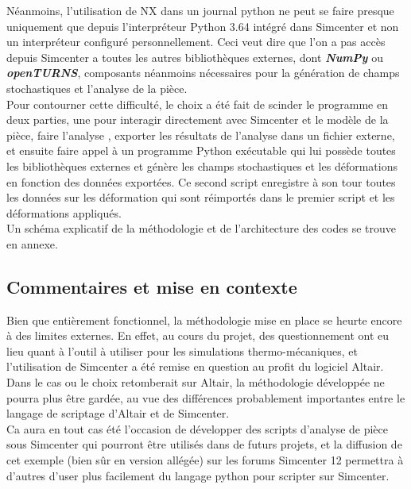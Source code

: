 \documentclass[a4paper,10pt]{article}
\begin{document}
Néanmoins, l'utilisation de NX dans un journal python ne peut se faire presque uniquement que depuis l’interpréteur Python 3.64 intégré dans Simcenter et non un interpréteur configuré personnellement. Ceci veut dire que l'on a pas accès depuis Simcenter a toutes les autres bibliothèques externes, dont \textit{\textbf{NumPy}} ou \textit{\textbf{openTURNS}}, composants néanmoins nécessaires pour la génération de champs stochastiques et l'analyse de la pièce. \\

Pour contourner cette difficulté, le choix a été fait de scinder le programme en deux parties, une pour interagir directement avec Simcenter et le modèle de la pièce, faire l'analyse , exporter les résultats de l'analyse dans un fichier externe, et ensuite faire appel à un programme Python exécutable qui lui possède toutes les bibliothèques externes et génère les champs stochastiques et les déformations en fonction des données exportées. Ce second script enregistre à son tour toutes les données sur les déformation qui sont réimportés dans le premier script et les déformations appliqués. \\

Un schéma explicatif de la méthodologie et de l'architecture des codes se trouve en annexe. \\

\subsection{Commentaires et mise en contexte}

Bien que entièrement fonctionnel, la méthodologie mise en place se heurte encore à des limites externes. En effet, au cours du projet, des questionnement ont eu lieu quant à l'outil à utiliser pour les simulations thermo-mécaniques, et l'utilisation de Simcenter a été remise en question au profit du logiciel Altair.\\ 
Dans le cas ou le choix retomberait sur Altair, la méthodologie développée ne pourra plus être gardée, au vue des différences probablement importantes entre le langage de scriptage d'Altair et de Simcenter.\\ 

Ca aura en tout cas été l'occasion de développer des scripts d'analyse de pièce sous Simcenter qui pourront être utilisés dans de futurs projets, et la diffusion de cet exemple (bien sûr en version allégée) sur les forums Simcenter 12 permettra à d'autres d'user plus facilement du langage python pour scripter sur Simcenter.  
\end{document}
